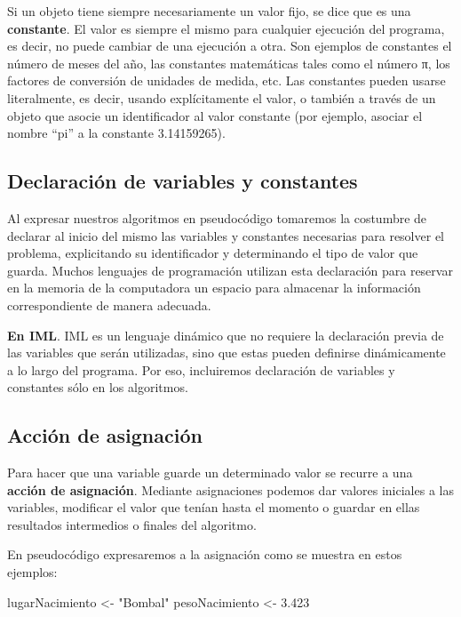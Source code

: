 \documentclass[
]{book}
\newenvironment{Shaded}{\begin{snugshade}}{\end{snugshade}}
\newcommand{\NormalTok}[1]{#1}
\begin{document}
Si un objeto tiene siempre necesariamente un valor fijo, se dice que es una \textbf{constante}. El valor es siempre el mismo para cualquier ejecución del programa, es decir, no puede cambiar de una ejecución a otra. Son ejemplos de constantes el número de meses del año, las constantes matemáticas tales como el número π, los factores de conversión de unidades de medida, etc. Las constantes pueden usarse literalmente, es decir, usando explícitamente el valor, o también a través de un objeto que asocie un identificador al valor constante (por ejemplo, asociar el nombre ``pi'' a la constante 3.14159265).

\hypertarget{declaraciuxf3n-de-variables-y-constantes}{%
\subsection{Declaración de variables y constantes}\label{declaraciuxf3n-de-variables-y-constantes}}

Al expresar nuestros algoritmos en pseudocódigo tomaremos la costumbre de declarar al inicio del mismo las variables y constantes necesarias para resolver el problema, explicitando su identificador y determinando el tipo de valor que guarda. Muchos lenguajes de programación utilizan esta declaración para reservar en la memoria de la computadora un espacio para almacenar la información correspondiente de manera adecuada.

\textbf{En IML}. IML es un lenguaje dinámico que no requiere la declaración previa de las variables que serán utilizadas, sino que estas pueden definirse dinámicamente a lo largo del programa. Por eso, incluiremos declaración de variables y constantes sólo en los algoritmos.

\hypertarget{acciuxf3n-de-asignaciuxf3n}{%
\subsection{Acción de asignación}\label{acciuxf3n-de-asignaciuxf3n}}

Para hacer que una variable guarde un determinado valor se recurre a una \textbf{acción de asignación}. Mediante asignaciones podemos dar valores iniciales a las variables, modificar el valor que tenían hasta el momento o guardar en ellas resultados intermedios o finales del algoritmo.

En pseudocódigo expresaremos a la asignación como se muestra en estos ejemplos:

\begin{Shaded}
\begin{Highlighting}[]
\NormalTok{lugarNacimiento \textless{}{-} "Bombal"}
\NormalTok{pesoNacimiento \textless{}{-} 3.423}
\end{Highlighting}
\end{Shaded}
\end{document}
